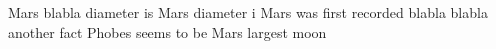 Mars blabla
diameter is 
Mars diameter i 
Mars was first recorded blabla 
blabla
another fact
Phobes seems to be Mars largest moon
